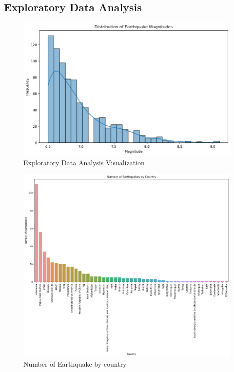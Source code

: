 \documentclass{article}
\begin{document}
\subsection{Exploratory Data Analysis}
\begin{figure}[H]
    \centering
    \includegraphics[width=0.8\linewidth]{FreqVs Magnitude.png} 
    \vspace*{-0.5cm}
    \caption{Exploratory Data Analysis Visualization}
    \label{fig:eda}
\end{figure}

\begin{figure}[H]
    \centering
    \includegraphics[width=0.899\linewidth]{Number of earthquake by country.png} 
    \vspace*{-0.5cm}
    \caption{Number of Earthquake by country}
    \label{fig:eda}
\end{figure}
\end{document}
